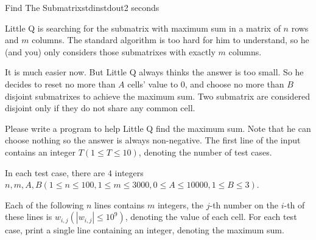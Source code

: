 \documentclass[11pt,a4paper,oneside]{article}
\newcommand{\timeLimit}{2 seconds}
\renewcommand{\defaultmemorylimit}{512 megabytes}
\begin{document}
\begin{problem}{Find The Submatrix}{stdin}{stdout}{\timeLimit}

Little Q is searching for the submatrix with maximum sum in a matrix of $n$ rows and $m$ columns. The standard algorithm is too hard for him to understand, so he (and you) only considers those submatrixes with exactly $m$ columns.\par
It is much easier now. But Little Q always thinks the answer is too small. So he decides to reset no more than $A$ cells' value to $0$, and choose no more than $B$ disjoint submatrixes to achieve the maximum sum. Two submatrix are considered disjoint only if they do not share any common cell.\par
Please write a program to help Little Q find the maximum sum. Note that he can choose nothing so the answer is always non-negative.
\InputFile
The first line of the input contains an integer $T(1\leq T\leq10)$, denoting the number of test cases.\par
In each test case, there are $4$ integers $n,m,A,B(1\leq n\leq 100,1\leq m\leq 3000,0\leq A\leq 10000,1\leq B\leq 3)$.\par
Each of the following $n$ lines contains $m$ integers, the $j$-th number on the $i$-th of these lines is $w_{i,j}(|w_{i,j}|\leq 10^9)$, denoting the value of each cell.
\OutputFile
For each test case, print a single line containing an integer, denoting the maximum sum.

\Examples
\begin{example}
%
\end{example}
\end{problem}
\renewcommand{\timeLimit}{1 second}
\renewcommand{\defaultmemorylimit}{512 megabytes}
\end{document}
